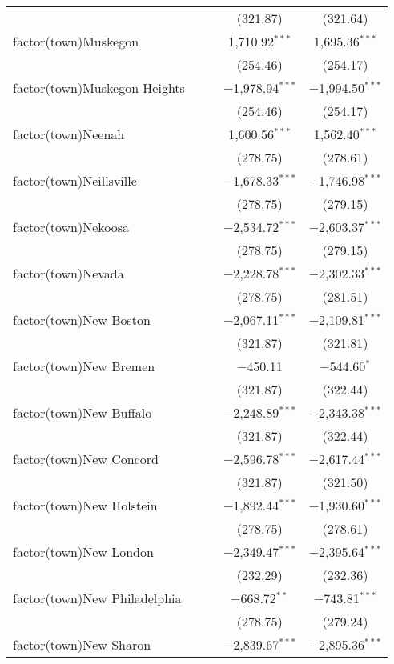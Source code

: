 \begin{table}[!htbp]
\begin{tabular}{@{\extracolsep{5pt}}lcccc}
  &  &  & (321.87) & (321.64) \\ 
  factor(town)Muskegon &  &  & 1,710.92$^{***}$ & 1,695.36$^{***}$ \\ 
  &  &  & (254.46) & (254.17) \\ 
  factor(town)Muskegon Heights &  &  & $-$1,978.94$^{***}$ & $-$1,994.50$^{***}$ \\ 
  &  &  & (254.46) & (254.17) \\ 
  factor(town)Neenah &  &  & 1,600.56$^{***}$ & 1,562.40$^{***}$ \\ 
  &  &  & (278.75) & (278.61) \\ 
  factor(town)Neillsville &  &  & $-$1,678.33$^{***}$ & $-$1,746.98$^{***}$ \\ 
  &  &  & (278.75) & (279.15) \\ 
  factor(town)Nekoosa &  &  & $-$2,534.72$^{***}$ & $-$2,603.37$^{***}$ \\ 
  &  &  & (278.75) & (279.15) \\ 
  factor(town)Nevada &  &  & $-$2,228.78$^{***}$ & $-$2,302.33$^{***}$ \\ 
  &  &  & (278.75) & (281.51) \\ 
  factor(town)New Boston &  &  & $-$2,067.11$^{***}$ & $-$2,109.81$^{***}$ \\ 
  &  &  & (321.87) & (321.81) \\ 
  factor(town)New Bremen &  &  & $-$450.11 & $-$544.60$^{*}$ \\ 
  &  &  & (321.87) & (322.44) \\ 
  factor(town)New Buffalo &  &  & $-$2,248.89$^{***}$ & $-$2,343.38$^{***}$ \\ 
  &  &  & (321.87) & (322.44) \\ 
  factor(town)New Concord &  &  & $-$2,596.78$^{***}$ & $-$2,617.44$^{***}$ \\ 
  &  &  & (321.87) & (321.50) \\ 
  factor(town)New Holstein &  &  & $-$1,892.44$^{***}$ & $-$1,930.60$^{***}$ \\ 
  &  &  & (278.75) & (278.61) \\ 
  factor(town)New London &  &  & $-$2,349.47$^{***}$ & $-$2,395.64$^{***}$ \\ 
  &  &  & (232.29) & (232.36) \\ 
  factor(town)New Philadelphia &  &  & $-$668.72$^{**}$ & $-$743.81$^{***}$ \\ 
  &  &  & (278.75) & (279.24) \\ 
  factor(town)New Sharon &  &  & $-$2,839.67$^{***}$ & $-$2,895.36$^{***}$ \\ 

\end{tabular}
\end{table}

